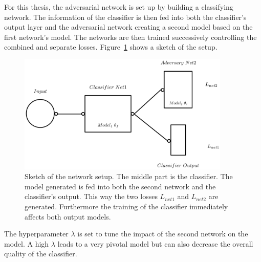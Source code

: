 For this thesis, the adversarial network is set up by building a classifying network. The information of the classifier is then fed into both the classifier's output layer and the adversarial network creating a second model based on the first network's model. The networks are then trained successively controlling the combined and separate losses. Figure~\ref{fig:ANN_sketch} shows a sketch of the setup.
%
\begin{figure}[htbp]
	\centering
	\includegraphics[width=0.9\textwidth]{figures_ML/ANN_sketch.png}
	\caption[Adversarial setup sketched]{Sketch of the network setup. The middle part is the classifier. The model generated is fed into both the second network and the classifier's output. This way the two losses $L_{net1}$ and $L_{net2}$ are generated. Furthermore the training of the classifier immediately affects both output models.}
	\label{fig:ANN_sketch}
\end{figure}
%
The hyperparameter $\lambda$ is set to tune the impact of the second network on the model. A high $\lambda$ leads to a very pivotal model but can also decrease the overall quality of the classifier.

